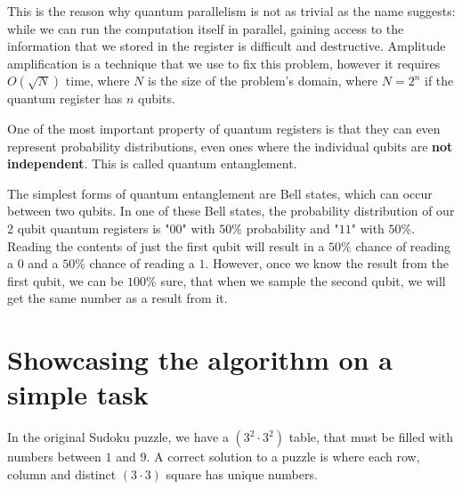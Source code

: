 This is the reason why quantum parallelism is not as trivial as the name suggests: while we can run the computation itself in parallel, gaining access to the information that we stored in the register is difficult and destructive. Amplitude amplification is a technique that we use to fix this problem, however it requires $O(\sqrt{N})$ time, where $N$ is the size of the problem's domain, where $N=2^n$ if the quantum register has $n$ qubits.

One of the most important property of quantum registers is that they can even represent probability distributions, even ones where the individual qubits are \textbf{not independent}. This is called quantum entanglement.

The simplest forms of quantum entanglement are Bell states, which can occur between two qubits. In one of these Bell states, the probability distribution of our 2 qubit quantum registers is "$00$" with $50\%$ probability and "$11$" with $50\%$. Reading the contents of just the first qubit will result in a $50\%$ chance of reading a $0$ and a $50\%$ chance of reading a $1$. However, once we know the result from the first qubit, we can be $100\%$ sure, that when we sample the second qubit, we will get the same number as a result from it.

\section{Showcasing the algorithm on a simple task}

In the original Sudoku puzzle, we have a $(3^2\cdot{}3^2)$ table, that must be filled with numbers between $1$ and $9$. A correct solution to a puzzle is where each row, column and distinct $(3\cdot{}3)$ square has unique numbers.

